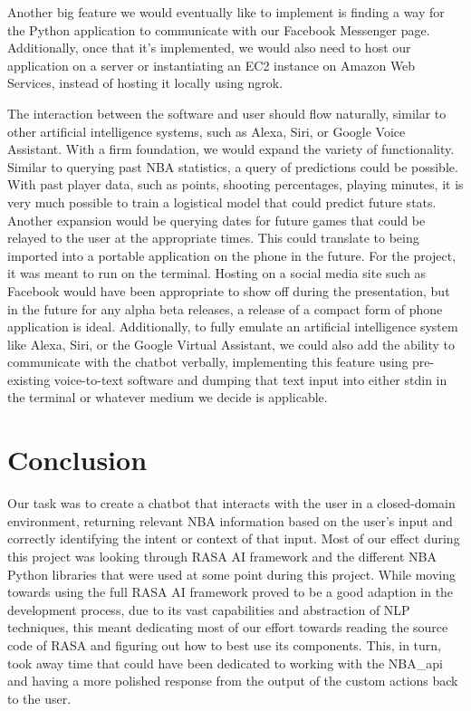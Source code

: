 \documentclass[conference]{IEEEtran}
\begin{document}
Another big feature we would eventually like to implement is finding a way for the Python application to communicate with our Facebook Messenger page. Additionally, once that it's implemented, we would also need to host our application on a server or instantiating an EC2 instance on Amazon Web Services, instead of hosting it locally using ngrok. 

The interaction between the software and user should flow naturally, similar to other artificial intelligence systems, such as Alexa, Siri, or Google Voice Assistant. With a firm foundation, we would expand the variety of functionality. Similar to querying past NBA statistics, a query of predictions could be possible. With past player data, such as points, shooting percentages, playing minutes, it is very much possible to train a logistical model that could predict future stats. Another expansion would be querying dates for future games that could be relayed to the user at the appropriate times. This could translate to being imported into a portable application on the phone in the future. For the project, it was meant to run on the terminal. Hosting on a social media site such as Facebook would have been appropriate to show off during the presentation, but in the future for any alpha beta releases, a release of a compact form of phone application is ideal. Additionally, to fully emulate an artificial intelligence system like Alexa, Siri, or the Google Virtual Assistant, we could also add the ability to communicate with the chatbot verbally, implementing this feature using pre-existing voice-to-text software and dumping that text input into either stdin in the terminal or whatever medium we decide is applicable.

\section*{Conclusion}
Our task was to create a chatbot that interacts with the user in a closed-domain environment, returning relevant NBA information based on the user's input and correctly identifying the intent or context of that input. Most of our effect during this project was looking through RASA AI framework and the different NBA Python libraries that were used at some point during this project. While moving towards using the full RASA AI framework proved to be a good adaption in the development process, due to its vast capabilities and abstraction of NLP techniques, this meant dedicating most of our effort towards reading the source code of RASA and figuring out how to best use its components. This, in turn, took away time that could have been dedicated to working with the NBA\_api and having a more polished response from the output of the custom actions back to the user. 
\end{document}
